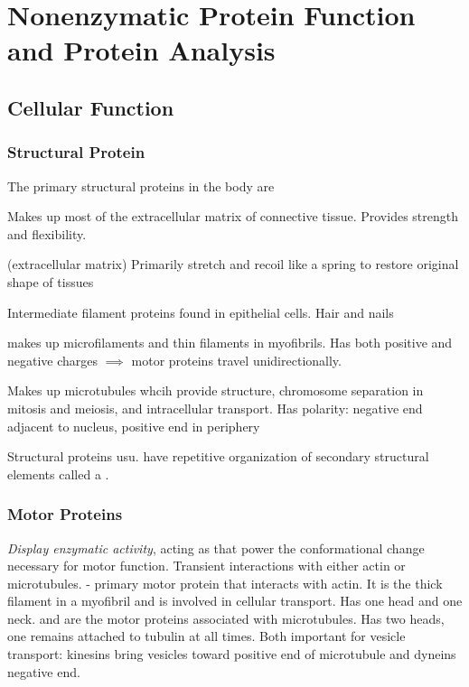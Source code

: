 \documentclass[../Bio_chemistryReview.tex]{subfiles}
\begin{document}
\chapter{Nonenzymatic Protein Function and Protein Analysis\supdag}

\section{Cellular Function\supdag}

\subsection{Structural Protein\supdag}

The primary structural proteins in the body are 
\begin{description}
  \item {}  Makes up most of the extracellular matrix of
    connective tissue. Provides strength and flexibility.  
  \item {} (extracellular matrix) Primarily stretch and recoil
    like a spring to restore original shape of tissues 
  \item {} Intermediate filament proteins found in epithelial
    cells. Hair and nails 
  \item {} makes up microfilaments and thin filaments in
    myofibrils. Has both positive and negative charges $ \implies $ motor
    proteins travel unidirectionally.  
  \item {} Makes up microtubules whcih provide structure,
    chromosome separation in mitosis and meiosis, and intracellular transport.
    Has polarity: negative end adjacent to nucleus, positive end in periphery
\end{description}

Structural proteins usu. have repetitive organization of secondary structural
elements called a .

\subsection{Motor Proteins\supdag}

\emph{Display enzymatic activity}, acting as  that power the
conformational change necessary for motor function. Transient interactions with
either actin or microtubules.  - primary motor protein that
interacts with actin. It is the thick filament in a myofibril and is involved in
cellular transport. Has one head and one neck.  and
 are the motor proteins associated with microtubules. Has two
heads, one remains attached to tubulin at all times. Both important for vesicle
transport: kinesins bring vesicles toward positive end of microtubule and
dyneins negative end. 
\end{document}
